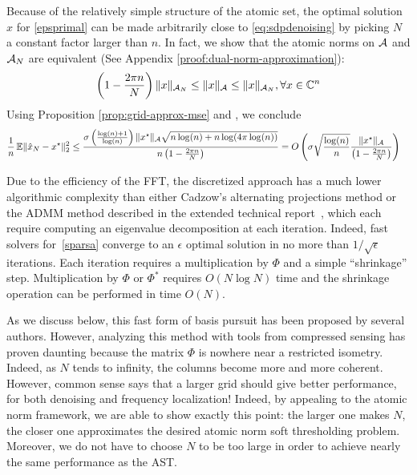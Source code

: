 Because of the relatively simple structure of the atomic set, the optimal
solution $\hat{x}$ for \eqref{epsprimal} can be made arbitrarily close to
\eqref{eq:sdpdenoising} by picking $N$ a constant factor larger than $n$. In
fact, we show that the atomic norms on $\mathcal{A}$ and $\mathcal{A}_N$ are equivalent (See
Appendix \ref{proof:dual-norm-approximation}):
\begin{equation}
 \left(1-\frac{2\pi n}{N}\right) \lVert x\rVert_{\mathcal{A}_N} \leq  \lVert x\rVert_{\mathcal{A}} \leq \lVert x\rVert_{\mathcal{A}_N}, \forall x \in \mathbb{C}^n
\end{equation}
Using Proposition
\ref{prop:grid-approx-mse} and , we conclude
{\small
\begin{align*}
\frac{1}{n} \operatorname{\mathbb{E}} \lVert\hat{x}_N - x^\star\rVert_2^2 
&\leq
\frac{\sigma\left(\frac{\log(n)+1}{\log(n)}\right)\lVert x^\star\rVert_{\mathcal{A}}
\sqrt{ n \log(n) + 
    n\log(4\pi\log(n))
}}{n\left(1 - \frac{2\pi n}{N}\right)} =
O\left(
\sigma \sqrt{\frac{\log(n)}{n}} \frac{ \lVert x^\star\rVert_{\mathcal{A}}}{\left(1 - \frac{2\pi n}{N}\right)}
\right)
\end{align*}
}

Due to the efficiency of the FFT, the discretized approach
has a much lower algorithmic complexity than either Cadzow's alternating
projections method or the ADMM method described in  the extended technical report~\cite{12BhaskarArxiv},
which each require computing an eigenvalue decomposition at
each iteration. Indeed, fast solvers for~\eqref{sparsa} converge to an
$\epsilon$ optimal solution in no more than $1/\sqrt{\epsilon}$ iterations.
Each iteration requires a multiplication by $\Phi$ and a simple ``shrinkage''
step. Multiplication by $\Phi$ or $\Phi^*$ requires $O(N\log N)$ time and the
shrinkage operation can be performed in time $O(N)$.

As we discuss below, this fast form of basis pursuit has been proposed by
several authors. However, analyzing this method with tools from compressed
sensing has proven daunting because the matrix $\Phi$ is nowhere near a
restricted isometry. Indeed, as $N$ tends to infinity, the columns become more
and more coherent. However, common sense says that a larger grid should give
better performance, for both denoising and frequency localization! Indeed, by appealing to the atomic norm framework, we are
able to show exactly this point: the larger one makes $N$, the closer one
approximates the desired atomic norm soft thresholding problem. Moreover, we do
not have to choose $N$ to be too large in order to achieve nearly the same
performance as the AST.




